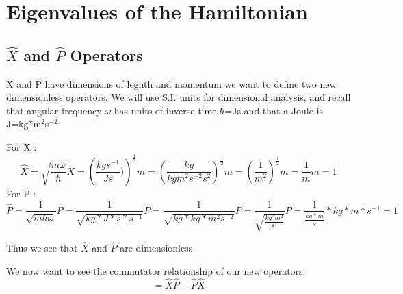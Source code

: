 \documentclass{article}
\newcommand{\be}{\begin{equation}}
\newcommand{\ee}{\end{equation}}
\begin{document}


\section{Eigenvalues of the Hamiltonian}

\subsection{$\hat{X}$ and $\hat{P}$ Operators}

X and P have dimensions of legnth and momentum we want to define two new dimensionless operators. We will use S.I. units for dimensional analysis, and recall that angular frequency $\omega$  has units of inverse time,$\hbar$=Js and that a Joule is J=kg*m$^2$s$^{-2}$

For X :
\be
\hat{X}=\sqrt{\frac{m\omega}{\hbar}}X=\left(\frac{kgs^{-1}}{Js})\right)^{\frac{1}{2}}m = \left(\frac{kg}{kgm^{2}s^{-2}s^{2}}\right)^{\frac{1}{2}}m = \left(\frac{1}{m^2}\right)^{\frac{1}{2}} m = \frac{1}{m}m = 1
\ee
For P :
\be
\hat{P} = \frac{1}{\sqrt{m\hbar \omega}} P = \frac{1}{\sqrt{kg *J*s*s^{-1}}} P = \frac{1}{\sqrt{kg*kg*m^2s^{-2}}} P = \frac{1}{\sqrt{\frac{kg^2m^2}{s^2}}} P = \frac{1}{\frac{kg*m}{s}}*kg*m*s^{-1} = 1
\ee

Thus we see that $\hat{X}$ and $\hat{P}$ are dimensionless

We now want to see the commutator relationship of our new operators.
\be
[\hat{X},\hat{P}] = \hat{X}\hat{P} - \hat{P}\hat{X}
\ee
\end{document}
